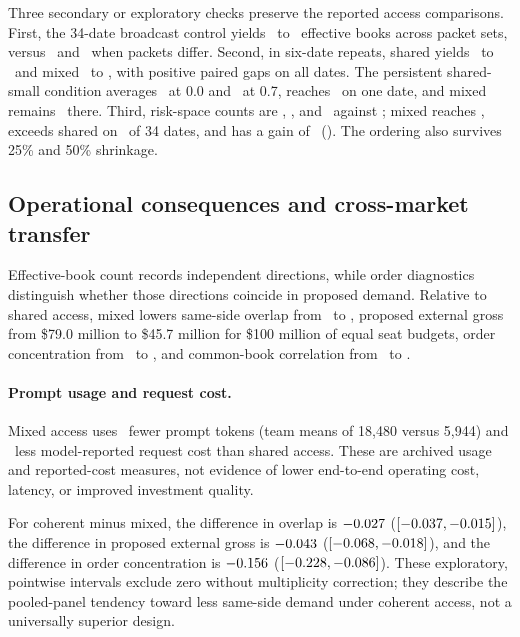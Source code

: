 \documentclass[sigconf]{acmart}
\begin{document}
Three secondary or exploratory checks preserve the reported access comparisons. First, the 34-date broadcast control yields \ShortMixedBroadcastNeff\ to \ShortCoherentBroadcastNeff\ effective books across packet sets, versus \MixedKSeven\ and \CoherentKSeven\ when packets differ. Second, in six-date repeats, shared yields \RepeatSharedTZero\ to \RepeatSharedTSeven\ and mixed \RepeatMixedTZero\ to \RepeatMixedTSeven, with positive paired gaps on all dates. The persistent shared-small condition averages \RepeatSmallTZero\ at 0.0 and \RepeatSmallTSeven\ at 0.7, reaches \RepeatSmallException\ on one date, and mixed remains \RepeatMixedExceptionRange\ there. Third, risk-space counts are \RiskSharedNeff, \RiskMixedNeff, and \RiskCoherentNeff\ against \RiskNullNeff; mixed reaches \RiskMixedNullShare, exceeds shared on \RiskMixedPositiveDates\ of 34 dates, and has a gain of \RiskMixedSharedNeff\ (\RiskMixedSharedNeffCI). The ordering also survives 25\% and 50\% shrinkage.

\subsection{Operational consequences and cross-market transfer}
Effective-book count records independent directions, while order diagnostics distinguish whether those directions coincide in proposed demand. Relative to shared access, mixed lowers same-side overlap from \SharedOverlap\ to \MixedOverlap, proposed external gross from \$79.0 million to \$45.7 million for \$100 million of equal seat budgets, order concentration from \SharedOrder\ to \MixedOrder, and common-book correlation from \SharedCommonBeta\ to \MixedCommonBeta.

\paragraph{Prompt usage and request cost.}
Mixed access uses \MixedPromptTokenReduction\ fewer prompt tokens (team means of 18{,}480 versus 5{,}944) and \MixedReportedCostReduction\ less model-reported request cost than shared access. These are archived usage and reported-cost measures, not evidence of lower end-to-end operating cost, latency, or improved investment quality.

For coherent minus mixed, the difference in overlap is $-0.027$ ($[-0.037, -0.015]$), the difference in proposed external gross is $-0.043$ ($[-0.068, -0.018]$), and the difference in order concentration is $-0.156$ ($[-0.228, -0.086]$). These exploratory, pointwise intervals exclude zero without multiplicity correction; they describe the pooled-panel tendency toward less same-side demand under coherent access, not a universally superior design.
\end{document}
